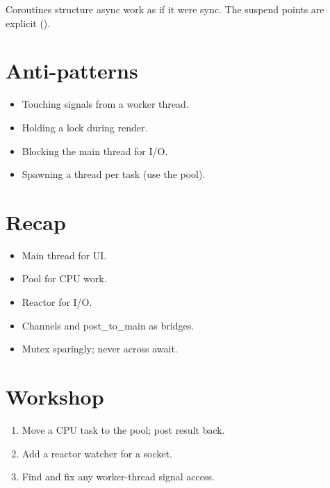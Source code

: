Coroutines structure async work as if it were sync. The
suspend points are explicit ().

\section{Anti-patterns}

\begin{itemize}[leftmargin=*]
  \item Touching signals from a worker thread.
  \item Holding a lock during render.
  \item Blocking the main thread for I/O.
  \item Spawning a thread per task (use the pool).
\end{itemize}

\section{Recap}

\begin{recap}
\begin{itemize}[leftmargin=*]
  \item Main thread for UI.
  \item Pool for CPU work.
  \item Reactor for I/O.
  \item Channels and post\_to\_main as bridges.
  \item Mutex sparingly; never across await.
\end{itemize}
\end{recap}

\section*{Workshop}

\begin{enumerate}[leftmargin=*]
  \item Move a CPU task to the pool; post result back.
  \item Add a reactor watcher for a socket.
  \item Find and fix any worker-thread signal access.
\end{enumerate}

